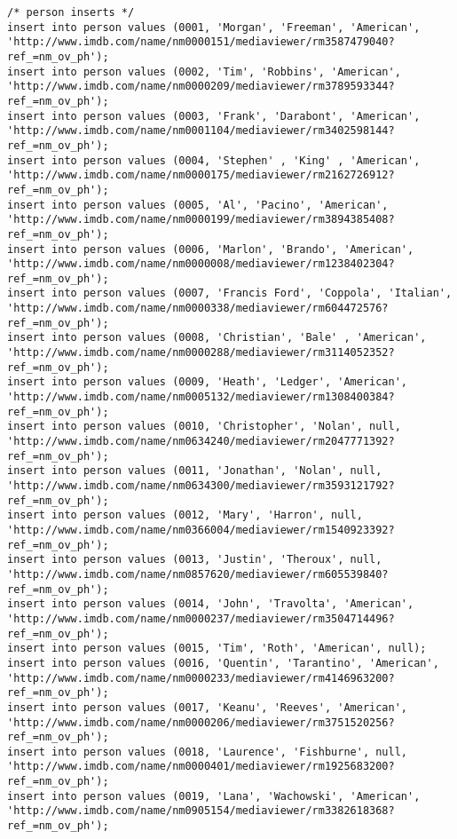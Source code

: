\documentclass[12pt]{article}
\begin{document}
\begin{lstlisting}
/* person inserts */
insert into person values (0001, 'Morgan', 'Freeman', 'American', 'http://www.imdb.com/name/nm0000151/mediaviewer/rm3587479040?ref_=nm_ov_ph');
insert into person values (0002, 'Tim', 'Robbins', 'American', 'http://www.imdb.com/name/nm0000209/mediaviewer/rm3789593344?ref_=nm_ov_ph');
insert into person values (0003, 'Frank', 'Darabont', 'American', 'http://www.imdb.com/name/nm0001104/mediaviewer/rm3402598144?ref_=nm_ov_ph');
insert into person values (0004, 'Stephen' , 'King' , 'American', 'http://www.imdb.com/name/nm0000175/mediaviewer/rm2162726912?ref_=nm_ov_ph');
insert into person values (0005, 'Al', 'Pacino', 'American', 'http://www.imdb.com/name/nm0000199/mediaviewer/rm3894385408?ref_=nm_ov_ph');
insert into person values (0006, 'Marlon', 'Brando', 'American', 'http://www.imdb.com/name/nm0000008/mediaviewer/rm1238402304?ref_=nm_ov_ph');
insert into person values (0007, 'Francis Ford', 'Coppola', 'Italian', 'http://www.imdb.com/name/nm0000338/mediaviewer/rm604472576?ref_=nm_ov_ph');
insert into person values (0008, 'Christian', 'Bale' , 'American', 'http://www.imdb.com/name/nm0000288/mediaviewer/rm3114052352?ref_=nm_ov_ph');
insert into person values (0009, 'Heath', 'Ledger', 'American', 'http://www.imdb.com/name/nm0005132/mediaviewer/rm1308400384?ref_=nm_ov_ph');
insert into person values (0010, 'Christopher', 'Nolan', null, 'http://www.imdb.com/name/nm0634240/mediaviewer/rm2047771392?ref_=nm_ov_ph');
insert into person values (0011, 'Jonathan', 'Nolan', null, 'http://www.imdb.com/name/nm0634300/mediaviewer/rm3593121792?ref_=nm_ov_ph');
insert into person values (0012, 'Mary', 'Harron', null, 'http://www.imdb.com/name/nm0366004/mediaviewer/rm1540923392?ref_=nm_ov_ph');
insert into person values (0013, 'Justin', 'Theroux', null, 'http://www.imdb.com/name/nm0857620/mediaviewer/rm605539840?ref_=nm_ov_ph');
insert into person values (0014, 'John', 'Travolta', 'American', 'http://www.imdb.com/name/nm0000237/mediaviewer/rm3504714496?ref_=nm_ov_ph');
insert into person values (0015, 'Tim', 'Roth', 'American', null);
insert into person values (0016, 'Quentin', 'Tarantino', 'American', 'http://www.imdb.com/name/nm0000233/mediaviewer/rm4146963200?ref_=nm_ov_ph');
insert into person values (0017, 'Keanu', 'Reeves', 'American', 'http://www.imdb.com/name/nm0000206/mediaviewer/rm3751520256?ref_=nm_ov_ph');
insert into person values (0018, 'Laurence', 'Fishburne', null, 'http://www.imdb.com/name/nm0000401/mediaviewer/rm1925683200?ref_=nm_ov_ph');
insert into person values (0019, 'Lana', 'Wachowski', 'American', 'http://www.imdb.com/name/nm0905154/mediaviewer/rm3382618368?ref_=nm_ov_ph');

\end{lstlisting}
\end{document}
